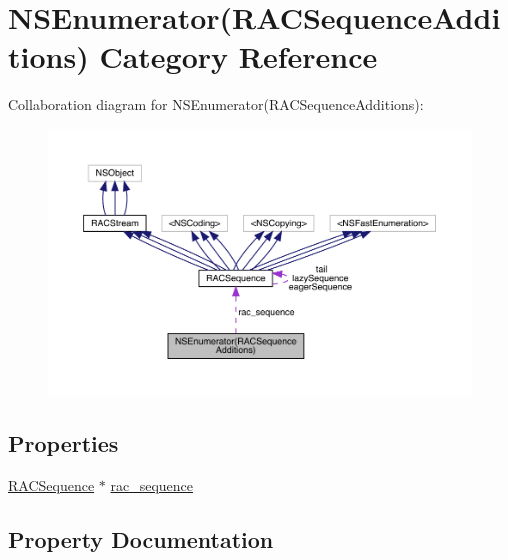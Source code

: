 \hypertarget{category_n_s_enumerator_07_r_a_c_sequence_additions_08}{}\section{N\+S\+Enumerator(R\+A\+C\+Sequence\+Additions) Category Reference}
\label{category_n_s_enumerator_07_r_a_c_sequence_additions_08}


Collaboration diagram for N\+S\+Enumerator(R\+A\+C\+Sequence\+Additions)\+:\nopagebreak
\begin{figure}[H]
\begin{center}
\leavevmode
\includegraphics[width=350pt]{category_n_s_enumerator_07_r_a_c_sequence_additions_08__coll__graph}
\end{center}
\end{figure}
\subsection*{Properties}
\begin{DoxyCompactItemize}
\item 
\mbox{\hyperlink{interface_r_a_c_sequence}{R\+A\+C\+Sequence}} $\ast$ \mbox{\hyperlink{category_n_s_enumerator_07_r_a_c_sequence_additions_08_a082b6eae84145a6ddee36039aee2f9e7}{rac\+\_\+sequence}}
\end{DoxyCompactItemize}


\subsection{Property Documentation}
\mbox{\label{category_n_s_enumerator_07_r_a_c_sequence_additions_08_a082b6eae84145a6ddee36039aee2f9e7}} 

